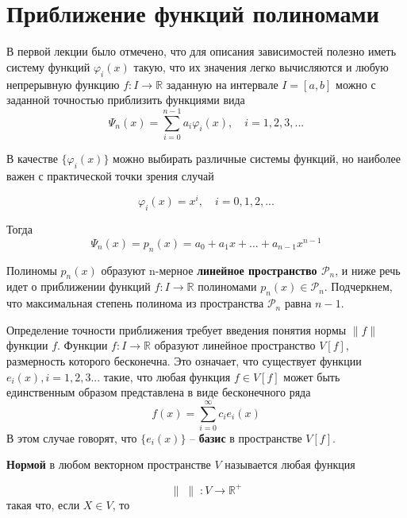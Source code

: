 \section{Приближение функций полиномами}

\label{lecture:2}

В первой лекции было отмечено, что для описания зависимостей полезно иметь систему функций $\varphi _i(x)$ такую, что их значения легко вычисляются и любую непрерывную функцию $f: I \rightarrow \mathbb{R} $ заданную на интервале $ I = [a,b] $ можно с заданной точностью приблизить функциями вида 
\begin{equation} \label{eq:2.1}
\varPsi_n(x)=\sum_{i=0}^{n-1}{a_i\varphi_i(x)}, \quad i = 1, 2, 3, ...
\end{equation}

В качестве $\{\varphi_i(x)\}$ можно выбирать различные системы функций, но наиболее важен с практической точки зрения случай 


\begin{equation}\label{eq:2.2}
\varphi _i(x) = x^i, \quad i = 0, 1, 2, ...
\end{equation}

Тогда
\begin{equation}\label{eq:polynom}
\varPsi _n(x) = p_n(x) = a_0 + a_1x + \dots + a_{n-1}x^{n-1} 
\end{equation}


Полиномы $p_n(x)$ образуют n-мерное \textbf{линейное пространство $\mathscr{P}_n$}, и ниже речь идет о приближении функций  $f:I \rightarrow \mathbb{R} $ полиномами $p_n(x) \in \mathscr{P}_n $. Подчеркнем, что максимальная степень полинома из пространства  $\mathscr{P}_n$ равна $n - 1$.


Определение точности приближения требует введения понятия нормы $\parallel f \parallel$ функции $f$. 
Функции $f: I \rightarrow \mathbb{R} $ образуют линейное пространство $V[f]$, размерность которого бесконечна. Это означает, что существует функции $e_i(x), i = 1, 2, 3 ...$ такие, что любая функция $f \in V[f]$ может быть единственным образом представлена в виде бесконечного ряда 
\begin{equation}
f(x) = \sum_{i=0}^{\infty} {c_i e_i(x)}
\end{equation}
В этом случае говорят, что $\{e_i(x)\}$ -- \textbf{базис} в пространстве $V[f]$.

\textbf{Нормой} в любом векторном пространстве $V$ называется любая функция 
 
\begin{equation}
\parallel \; \parallel \; : V \rightarrow \mathbb{R}^+
\end{equation}
такая что, если $X\in V$, то

